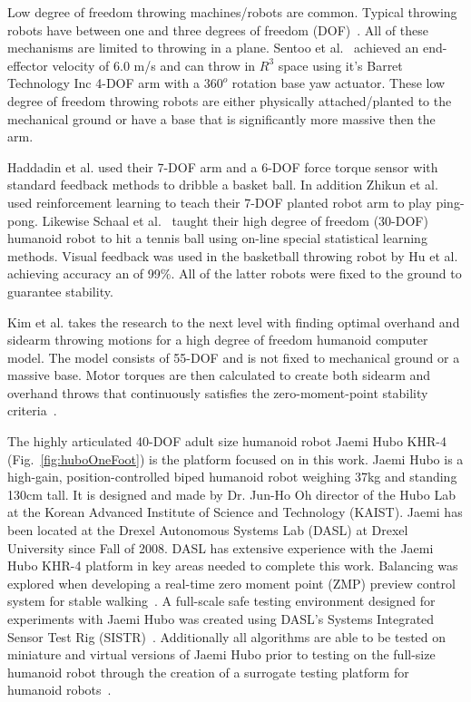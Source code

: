 Low degree of freedom throwing machines/robots are common.  Typical throwing robots have between one and three degrees of freedom (DOF)~\cite{509405, Lynch97dynamicnonprehensile, 5152525, 509335, springerlink:10.1007/s10015-006-0401-0}.  All of these mechanisms are limited to throwing in a plane.   Sentoo et al.~\cite{4651142} achieved an end-effector velocity of 6.0 m/s and can throw in $R^3$ space using it's Barret Technology Inc 4-DOF arm with a $360^o$ rotation base yaw actuator.  These low degree of freedom throwing robots are either physically attached/planted to the mechanical ground or have a base that is significantly more massive then the arm.  

Haddadin et al.\cite{6094757} used their 7-DOF arm and a 6-DOF force torque sensor with standard feedback methods to dribble a basket ball.  In addition Zhikun et al.~\cite{6094892} used reinforcement learning to teach their 7-DOF planted robot arm to play ping-pong.  Likewise Schaal et al.~\cite{schaal01/BIRG} taught their high degree of freedom (30-DOF) humanoid robot to hit a tennis ball using on-line special statistical learning methods.  Visual feedback was used in the basketball throwing robot by Hu et al.~\cite{5649335} achieving accuracy an of 99\%.  All of the latter robots were fixed to the ground to guarantee stability.

Kim et al. \cite{5686315,JooH2011438} takes the research to the next level with finding optimal overhand and sidearm throwing motions for a high degree of freedom humanoid computer model.  The model consists of 55-DOF and is not fixed to mechanical ground or a massive base.  Motor torques are then calculated to create both sidearm and overhand throws that continuously satisfies the zero-moment-point stability criteria~\cite{4309277}.  

The highly articulated 40-DOF adult size humanoid robot Jaemi Hubo KHR-4 (Fig.~\ref{fig:huboOneFoot}) is the platform focused on in this work.  Jaemi Hubo is a high-gain, position-controlled biped humanoid robot weighing 37kg and standing 130cm tall.  It is designed and made by Dr. Jun-Ho Oh director of the Hubo Lab at the Korean Advanced Institute of Science and Technology (KAIST).  Jaemi has been located at the Drexel Autonomous Systems Lab (DASL) at Drexel University since Fall of 2008.  DASL has extensive experience with the Jaemi Hubo KHR-4 platform in key areas needed to complete this work.  Balancing was explored when developing a real-time zero moment point (ZMP) preview control system for stable walking~\cite{5686276}.  A full-scale safe testing environment designed for experiments with Jaemi Hubo was created using DASL's Systems Integrated Sensor Test Rig (SISTR)~\cite{5686325}.  Additionally all algorithms are able to be tested on miniature and virtual versions of Jaemi Hubo prior to testing on the full-size humanoid robot through the creation of a surrogate testing platform for humanoid robots~\cite{5379582}.


